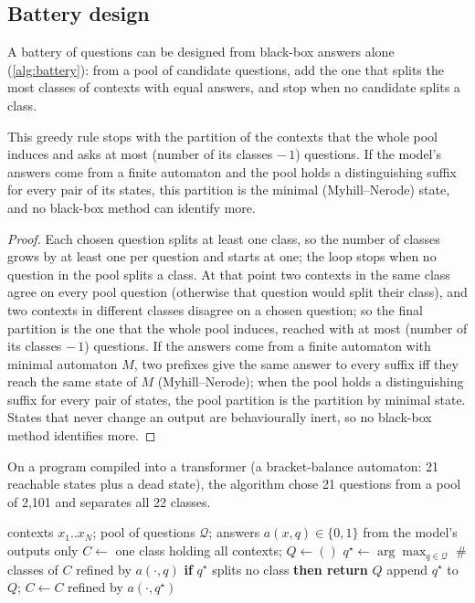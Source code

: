 \subsection{Battery design}
\label{app:battery}
A battery of questions can be designed from black-box answers alone (\cref{alg:battery}): from a pool of candidate questions, add the one that splits the most classes of contexts with equal answers, and stop when no candidate splits a class.
\begin{proposition}\label{prop:battery}
This greedy rule stops with the partition of the contexts that the whole pool induces and asks at most (number of its classes $-\,1$) questions. If the model's answers come from a finite automaton and the pool holds a distinguishing suffix for every pair of its states, this partition is the minimal (Myhill--Nerode) state, and no black-box method can identify more.
\end{proposition}
\begin{proof}
Each chosen question splits at least one class, so the number of classes grows
by at least one per question and starts at one; the loop stops when no question in the pool splits a class. At that point two
contexts in the same class agree on every pool question (otherwise that question would split their class), and two contexts
in different classes disagree on a chosen question; so the final partition is the one that the whole pool induces, reached
with at most (number of its classes $-\,1$) questions. If the answers come from a finite automaton with minimal automaton $M$,
two prefixes give the same answer to every suffix iff they reach the same state of $M$ (Myhill--Nerode); when the pool holds a
distinguishing suffix for every pair of states, the pool partition is the partition by minimal state. States that never change
an output are behaviourally inert, so no black-box method identifies more.
\end{proof}
On a program compiled into a transformer (a bracket-balance automaton: 21 reachable states plus a dead state), the algorithm chose 21 questions from a pool of 2{,}101 and separates all 22 classes.

\begin{algorithm}[t]
\caption{Battery design from black-box answers}
\label{alg:battery}
\small
\begin{algorithmic}[1]
\REQUIRE contexts $x_1..x_N$; pool of questions $\mathcal Q$; answers $a(x,q)\in\{0,1\}$ from the model's outputs only
\STATE $C\gets$ one class holding all contexts; $Q\gets()$
\LOOP
  \STATE $q^\star\gets\arg\max_{q\in\mathcal Q}$ $\#$classes of $C$ refined by $a(\cdot,q)$
  \STATE \textbf{if} $q^\star$ splits no class \textbf{then return} $Q$ 
  \STATE append $q^\star$ to $Q$; $C\gets C$ refined by $a(\cdot,q^\star)$
\ENDLOOP
\end{algorithmic}
\end{algorithm}

